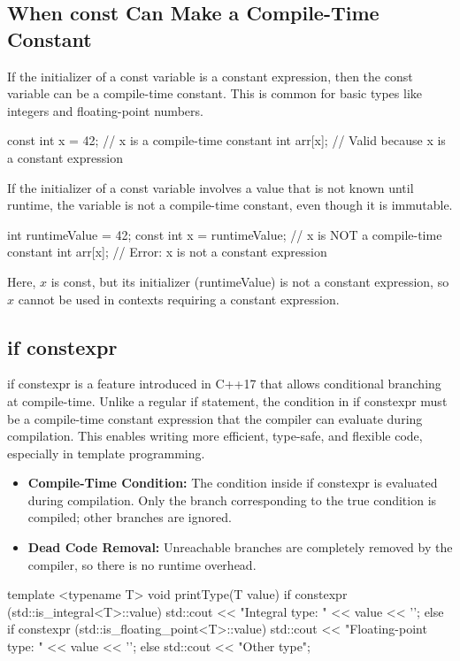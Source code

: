 \documentclass{report}
\begin{document}
\subsection{When const Can Make a Compile-Time Constant}
\bigbreak \noindent 
If the initializer of a const variable is a constant expression, then the const variable can be a compile-time constant. This is common for basic types like integers and floating-point numbers.
\bigbreak \noindent 
\begin{cppcode}
const int x = 42; // x is a compile-time constant
int arr[x];       // Valid because x is a constant expression
\end{cppcode}
\bigbreak \noindent 
If the initializer of a const variable involves a value that is not known until runtime, the variable is not a compile-time constant, even though it is immutable.
\bigbreak \noindent 
\begin{cppcode}
int runtimeValue = 42;
const int x = runtimeValue; // x is NOT a compile-time constant
int arr[x];                // Error: x is not a constant expression
\end{cppcode}
\bigbreak \noindent 
Here, $x$ is const, but its initializer (runtimeValue) is not a constant expression, so $x$ cannot be used in contexts requiring a constant expression.

\bigbreak \noindent 
\subsection{if constexpr}
\bigbreak \noindent 
if constexpr is a feature introduced in C++17 that allows conditional branching at compile-time. Unlike a regular if statement, the condition in if constexpr must be a compile-time constant expression that the compiler can evaluate during compilation. This enables writing more efficient, type-safe, and flexible code, especially in template programming.
\begin{itemize}
    \item \textbf{Compile-Time Condition:} The condition inside if constexpr is evaluated during compilation.
        \bigbreak \noindent 
        Only the branch corresponding to the true condition is compiled; other branches are ignored.
\item \textbf{Dead Code Removal:} Unreachable branches are completely removed by the compiler, so there is no runtime overhead.
\end{itemize}
\bigbreak \noindent 
\begin{cppcode}
template <typename T>
void printType(T value) {
    if constexpr (std::is_integral<T>::value) {
        std::cout << "Integral type: " << value << '\n';
    } else if constexpr (std::is_floating_point<T>::value) {
        std::cout << "Floating-point type: " << value << '\n';
    } else {
        std::cout << "Other type\n";
    }
}
\end{cppcode}
\end{document}
